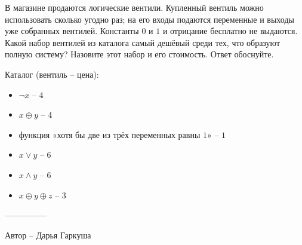 \question
В магазине продаются логические вентили. Купленный вентиль можно использовать сколько угодно раз; на его входы подаются переменные и выходы уже собранных вентилей. Константы $0$ и $1$ и отрицание бесплатно не выдаются. Какой набор вентилей из каталога самый дешёвый среди тех, что образуют полную систему? Назовите этот набор и его стоимость. Ответ обоснуйте.

Каталог (вентиль -- цена):
\begin{itemize}
    \item $\neg x$ -- $4$
    \item $x\oplus y$ -- $4$
    \item функция «хотя бы две из трёх переменных равны $1$» -- $1$
    \item $x\vee y$ -- $6$
    \item $x\wedge y$ -- $6$
    \item $x\oplus y\oplus z$ -- $3$
\end{itemize}

---------------

Автор -- Дарья Гаркуша